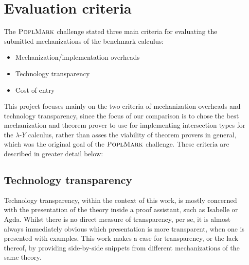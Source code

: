 \documentclass[a4paper, 12pt, twoside]{style/ociamthesis}
\theoremstyle{plain}
\theoremstyle{definition}
\theoremstyle{remark}
\providecommand{\tightlist}{%
  \setlength{\itemsep}{0pt}\setlength{\parskip}{0pt}}
\newcommand{\lamy}{\lambda\text{-}Y}
\newcommand{\poplm}{\textsc{PoplMark}}
\begin{document}
\section{Evaluation criteria}\label{evaluation-criteria}

The \(\poplm\) challenge stated three main criteria for evaluating the
submitted mechanizations of the benchmark calculus:

\begin{itemize}
\tightlist
\item
  Mechanization/implementation overheads
\item
  Technology transparency
\item
  Cost of entry
\end{itemize}

This project focuses mainly on the two criteria of mechanization
overheads and technology transparency, since the focus of our comparison
is to chose the best mechanization and theorem prover to use for
implementing intersection types for the \(\lamy\) calculus, rather than
asses the viability of theorem provers in general, which was the
original goal of the \(\poplm\) challenge. These criteria are described
in greater detail below:

\subsection{Technology transparency}\label{technology-transparency}

Technology transparency, within the context of this work, is mostly
concerned with the presentation of the theory inside a proof assistant,
such as Isabelle or Agda. Whilst there is no direct measure of
transparency, per se, it is almost always immediately obvious which
presentation is more transparent, when one is presented with examples.
This work makes a case for transparency, or the lack thereof, by
providing side-by-side snippets from different mechanizations of the
same theory.
\end{document}

